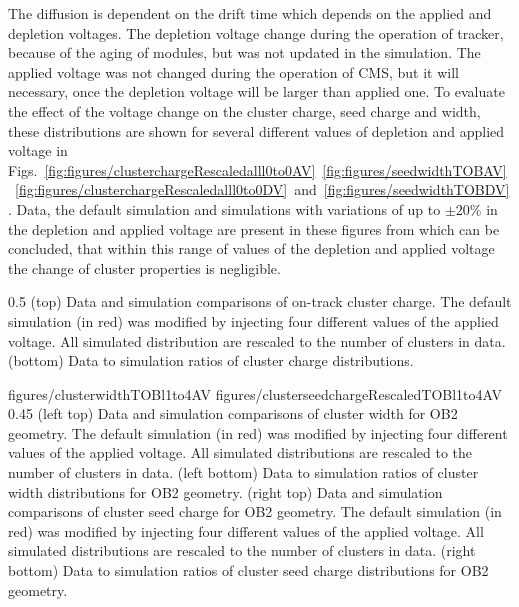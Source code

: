 The diffusion is dependent on the drift time which depends on the applied and depletion voltages. The depletion voltage change during the operation of tracker, because of the aging of modules, but was not updated in the simulation. The applied voltage was not changed during the operation of CMS, but it will necessary, once the depletion voltage will be larger than applied one. To evaluate the effect of the voltage change on the cluster charge, seed charge and width, these distributions are shown for several different values of depletion and applied voltage in Figs.~\ref{fig:figures/clusterchargeRescaledalll0to0AV}~\ref{fig:figures/seedwidthTOBAV}~\ref{fig:figures/clusterchargeRescaledalll0to0DV}~and~\ref{fig:figures/seedwidthTOBDV}. Data, the default simulation and simulations with variations of up to $\pm 20\%$ in the depletion and applied voltage are present in these figures from which can be concluded, that within this range of values of the depletion and applied voltage the change of cluster properties is negligible.

                 {0.5}       %
                 { (top) Data and simulation comparisons of on-track cluster charge. The default simulation (in red) was modified by injecting four different values of the applied voltage. All simulated distribution are rescaled to the number of clusters in data. (bottom) Data to simulation ratios of cluster charge distributions. }

                 {figures/clusterwidthTOBl1to4AV}
                 {figures/clusterseedchargeRescaledTOBl1to4AV} %
                 {0.45}       %
                 {(left top) Data and simulation  comparisons of cluster width for OB2 geometry. The default simulation (in red) was modified by injecting four different values of the applied voltage. All simulated distributions are rescaled to the number of clusters in data. (left bottom) Data to simulation ratios of cluster width distributions for OB2 geometry. (right top) Data and simulation  comparisons of cluster seed charge for OB2 geometry. The default simulation (in red) was modified by injecting four different values of the applied voltage. All simulated distributions are rescaled to the number of clusters in data. (right bottom) Data to simulation ratios of cluster seed charge distributions for OB2 geometry. }


